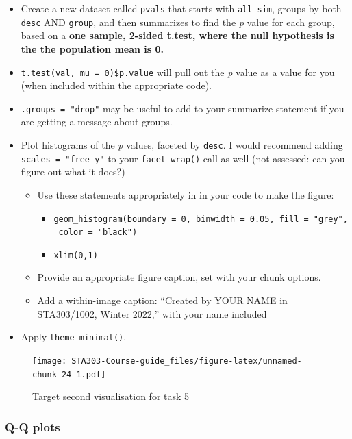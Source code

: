 \documentclass[
  openany]{book}
\providecommand{\tightlist}{%
  \setlength{\itemsep}{0pt}\setlength{\parskip}{0pt}}
\begin{document}
\begin{itemize}
\item
  Create a new dataset called \texttt{pvals} that starts with \texttt{all\_sim}, groups by both \texttt{desc} AND \texttt{group}, and then summarizes to find the \emph{p} value for each group, based on a \textbf{one sample, 2-sided t.test, where the null hypothesis is the the population mean is 0.}
\item
  \texttt{t.test(val,\ mu\ =\ 0)\$p.value} will pull out the \emph{p} value as a value for you (when included within the appropriate code).\\
\item
  \texttt{.groups\ =\ "drop"} may be useful to add to your summarize statement if you are getting a message about groups.
\item
  Plot histograms of the \emph{p} values, faceted by \texttt{desc}. I would recommend adding \texttt{scales\ =\ "free\_y"} to your \texttt{facet\_wrap()} call as well (not assessed: can you figure out what it does?)

  \begin{itemize}
  \tightlist
  \item
    Use these statements appropriately in in your code to make the figure:

    \begin{itemize}
    \tightlist
    \item
      \texttt{geom\_histogram(boundary\ =\ 0,\ binwidth\ =\ 0.05,\ fill\ =\ "grey",\ color\ =\ "black")}
    \item
      \texttt{xlim(0,1)}
    \end{itemize}
  \item
    Provide an appropriate figure caption, set with your chunk options.
  \item
    Add a within-image caption: ``Created by YOUR NAME in STA303/1002, Winter 2022,'' with your name included
  \end{itemize}
\item
  Apply \texttt{theme\_minimal()}.
\end{itemize}

\begin{figure}
\centering
\texttt{[image: STA303-Course-guide\_files/figure-latex/unnamed-chunk-24-1.pdf]}
\caption{\label{fig:unnamed-chunk-24}Target second visualisation for task 5}
\end{figure}

\hypertarget{q-q-plots}{%
\subsubsection{Q-Q plots}\label{q-q-plots}}
\end{document}
